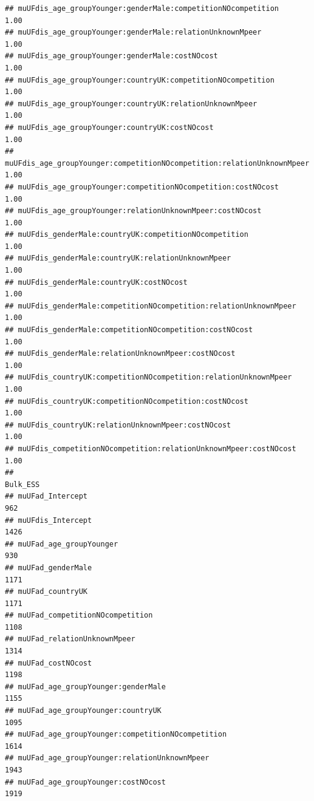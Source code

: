 \documentclass[
]{article}
\begin{document}
\begin{verbatim}
## muUFdis_age_groupYounger:genderMale:competitionNOcompetition           1.00
## muUFdis_age_groupYounger:genderMale:relationUnknownMpeer               1.00
## muUFdis_age_groupYounger:genderMale:costNOcost                         1.00
## muUFdis_age_groupYounger:countryUK:competitionNOcompetition            1.00
## muUFdis_age_groupYounger:countryUK:relationUnknownMpeer                1.00
## muUFdis_age_groupYounger:countryUK:costNOcost                          1.00
## muUFdis_age_groupYounger:competitionNOcompetition:relationUnknownMpeer 1.00
## muUFdis_age_groupYounger:competitionNOcompetition:costNOcost           1.00
## muUFdis_age_groupYounger:relationUnknownMpeer:costNOcost               1.00
## muUFdis_genderMale:countryUK:competitionNOcompetition                  1.00
## muUFdis_genderMale:countryUK:relationUnknownMpeer                      1.00
## muUFdis_genderMale:countryUK:costNOcost                                1.00
## muUFdis_genderMale:competitionNOcompetition:relationUnknownMpeer       1.00
## muUFdis_genderMale:competitionNOcompetition:costNOcost                 1.00
## muUFdis_genderMale:relationUnknownMpeer:costNOcost                     1.00
## muUFdis_countryUK:competitionNOcompetition:relationUnknownMpeer        1.00
## muUFdis_countryUK:competitionNOcompetition:costNOcost                  1.00
## muUFdis_countryUK:relationUnknownMpeer:costNOcost                      1.00
## muUFdis_competitionNOcompetition:relationUnknownMpeer:costNOcost       1.00
##                                                                        Bulk_ESS
## muUFad_Intercept                                                            962
## muUFdis_Intercept                                                          1426
## muUFad_age_groupYounger                                                     930
## muUFad_genderMale                                                          1171
## muUFad_countryUK                                                           1171
## muUFad_competitionNOcompetition                                            1108
## muUFad_relationUnknownMpeer                                                1314
## muUFad_costNOcost                                                          1198
## muUFad_age_groupYounger:genderMale                                         1155
## muUFad_age_groupYounger:countryUK                                          1095
## muUFad_age_groupYounger:competitionNOcompetition                           1614
## muUFad_age_groupYounger:relationUnknownMpeer                               1943
## muUFad_age_groupYounger:costNOcost                                         1919

\end{verbatim}
\end{document}
